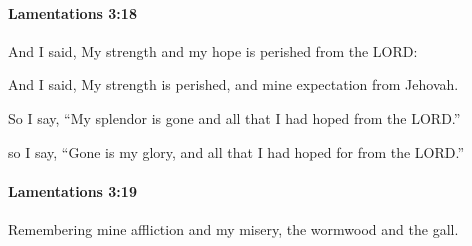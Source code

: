 		\paragraph{Lamentations 3:18} %
			\label{LAMENTATIONS-3-18}

			And I said, My strength and my hope is perished from the LORD:

			\begin{versebox}
					\item[BHS] 
					\item[LXX] 
					\item[ASV] And I said, My strength is perished, and mine expectation from Jehovah.
					\item[NIV] So I say, “My splendor is gone and all that I had hoped from the LORD.”
					\item[NRSV] so I say, “Gone is my glory, and all that I had hoped for from the LORD.”
			\end{versebox}

		\paragraph{Lamentations 3:19} %
			\label{LAMENTATIONS-3-19}

			Remembering mine affliction and my misery, the wormwood and the gall.

